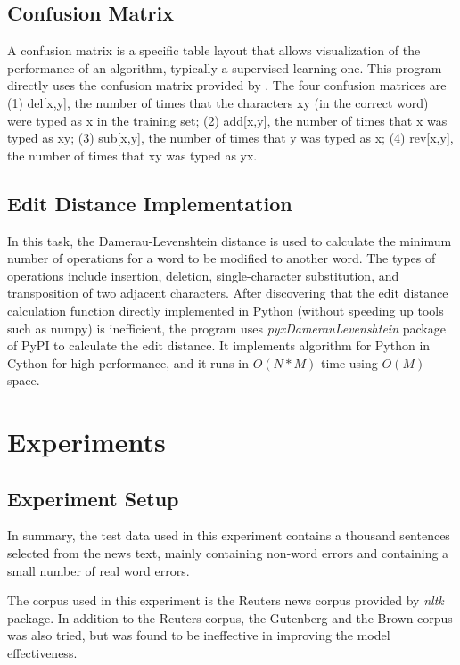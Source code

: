\documentclass{article}
\begin{document}
\subsection{Confusion Matrix}

A confusion matrix is a specific table layout that allows visualization of the performance of an algorithm, typically a supervised learning one. 
This program directly uses the confusion matrix provided by \cite{kernighan1990spelling}.
The four confusion matrices are (1) del{[}x,y{]}, the number of times that the characters xy (in the correct word) were typed as x in the training set; (2) add{[}x,y{]}, the number of times that x was typed as xy; (3) sub{[}x,y{]}, the number of times that y was typed as x; (4) rev{[}x,y{]}, the number of times that xy was typed as yx.

\subsection{Edit Distance Implementation}

In this task, the Damerau-Levenshtein distance is used to calculate
the minimum number of operations for a word to be modified to another
word. The types of operations include insertion, deletion, single-character
substitution, and transposition of two adjacent characters. After
discovering that the edit distance calculation function directly implemented
in Python (without speeding up tools such as numpy) is inefficient,
the program uses \textit{pyxDamerauLevenshtein} package of PyPI to
calculate the edit distance. It implements algorithm for Python in
Cython for high performance, and it runs in $O(N*M)$ time using $O(M)$
space.

\section{Experiments}
\label{Experiments}

\subsection{Experiment Setup}

In summary, the test data used in this experiment contains a thousand
sentences selected from the news text, mainly containing non-word
errors and containing a small number of real word errors.

The corpus used in this experiment is the Reuters news corpus provided
by \textit{nltk} package. In addition to the Reuters corpus, the Gutenberg
and the Brown corpus was also tried, but was found to be ineffective
in improving the model effectiveness.
\end{document}
